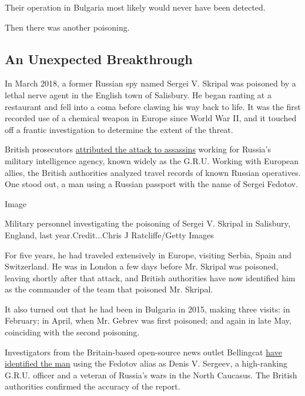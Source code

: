 Their operation in Bulgaria most likely would never have been detected.

Then there was another poisoning.

\hypertarget{an-unexpected-breakthrough}{%
\subsection{An Unexpected
Breakthrough}\label{an-unexpected-breakthrough}}

In March 2018, a former Russian spy named Sergei V. Skripal was poisoned
by a lethal nerve agent in the English town of Salisbury. He began
ranting at a restaurant and fell into a coma before clawing his way back
to life. It was the first recorded use of a chemical weapon in Europe
since World War II, and it touched off a frantic investigation to
determine the extent of the threat.

British prosecutors
\href{https://www.nytimes.com/2018/09/05/world/europe/russia-uk-novichok-skripal.html}{attributed
the attack to assassins} working for Russia's military intelligence
agency, known widely as the G.R.U. Working with European allies, the
British authorities analyzed travel records of known Russian operatives.
One stood out, a man using a Russian passport with the name of Sergei
Fedotov.

Image

Military personnel investigating the poisoning of Sergei V. Skripal in
Salisbury, England, last year.Credit...Chris J Ratcliffe/Getty Images

For five years, he had traveled extensively in Europe, visiting Serbia,
Spain and Switzerland. He was in London a few days before Mr. Skripal
was poisoned, leaving shortly after that attack, and British authorities
have now identified him as the commander of the team that poisoned Mr.
Skripal.

It also turned out that he had been in Bulgaria in 2015, making three
visits: in February; in April, when Mr. Gebrev was first poisoned; and
again in late May, coinciding with the second poisoning.

Investigators from the Britain-based open-source news outlet Bellingcat
\href{https://www.bellingcat.com/news/uk-and-europe/2019/02/14/third-suspect-in-skripal-poisoning-identified-as-denis-sergeev-high-ranking-gru-officer/}{have
identified the man} using the Fedotov alias as Denis V. Sergeev, a
high-ranking G.R.U. officer and a veteran of Russia's wars in the North
Caucasus. The British authorities confirmed the accuracy of the report.

